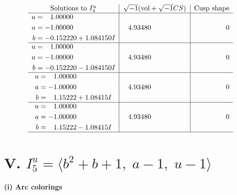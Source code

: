 \documentclass[1p]{elsarticle_modified}
\theoremstyle{definition}
\newcommand{\I}{\sqrt{-1}}
\begin{document}
$$\begin{array}{c|c|c}  
\text{Solutions to }I^u_{4}& \I (\text{vol} + \sqrt{-1}CS) & \text{Cusp shape}\\
 \hline 
\begin{aligned}
u &= \phantom{-}1.00000\phantom{ +0.000000I} \\
a &= -1.00000\phantom{ +0.000000I} \\
b &= -0.152220 + 1.084150 I\end{aligned}
 & \phantom{-}4.93480\phantom{ +0.000000I} & \phantom{-0.000000 } 0 \\ \hline\begin{aligned}
u &= \phantom{-}1.00000\phantom{ +0.000000I} \\
a &= -1.00000\phantom{ +0.000000I} \\
b &= -0.152220 - 1.084150 I\end{aligned}
 & \phantom{-}4.93480\phantom{ +0.000000I} & \phantom{-0.000000 } 0 \\ \hline\begin{aligned}
u &= \phantom{-}1.00000\phantom{ +0.000000I} \\
a &= -1.00000\phantom{ +0.000000I} \\
b &= \phantom{-}1.15222 + 1.08415 I\end{aligned}
 & \phantom{-}4.93480\phantom{ +0.000000I} & \phantom{-0.000000 } 0 \\ \hline\begin{aligned}
u &= \phantom{-}1.00000\phantom{ +0.000000I} \\
a &= -1.00000\phantom{ +0.000000I} \\
b &= \phantom{-}1.15222 - 1.08415 I\end{aligned}
 & \phantom{-}4.93480\phantom{ +0.000000I} & \phantom{-0.000000 } 0\\
 \hline 
 \end{array}$$\newpage\newpage\renewcommand{\arraystretch}{1}
\centering \section*{V. $I^u_{5}= \langle b^2+b+1,\;a-1,\;u-1 \rangle$}
\flushleft \textbf{(i) Arc colorings}\\
\end{document}
